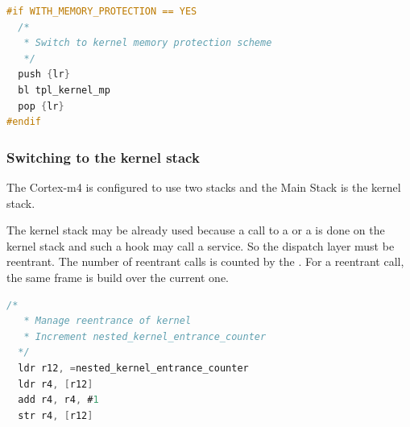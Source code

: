 \begin{lstlisting}[language=C]
#if WITH_MEMORY_PROTECTION == YES
  /*
   * Switch to kernel memory protection scheme
   */
  push {lr}
  bl tpl_kernel_mp
  pop {lr}
#endif
\end{lstlisting}

\subsubsection{Switching to the kernel stack}

The Cortex-m4 is configured to use two stacks and the Main Stack is the kernel stack.

The kernel stack may be already used because a call to a  or a  is done on the kernel stack and such a hook may call a service. So the dispatch layer must be reentrant. The number of reentrant calls is counted by the . For a reentrant call, the same frame is build over the current one.

\begin{lstlisting}[language=C]
  /* 
   * Manage reentrance of kernel
   * Increment nested_kernel_entrance_counter
  */
  ldr r12, =nested_kernel_entrance_counter
  ldr r4, [r12]
  add r4, r4, #1
  str r4, [r12]
\end{lstlisting}

